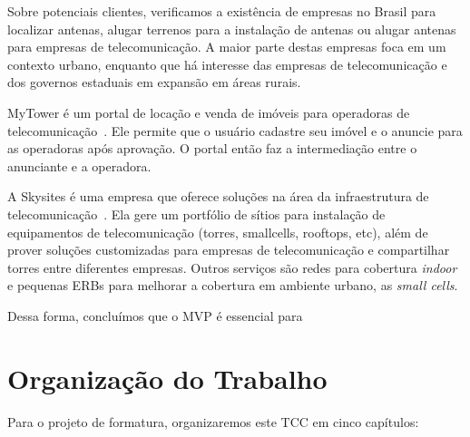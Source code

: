 \documentclass[]{politex}
\begin{document}
Sobre potenciais clientes, verificamos a existência de empresas no Brasil para
localizar antenas, alugar terrenos para a instalação de antenas ou alugar
antenas para empresas de telecomunicação. A maior parte destas empresas foca em
um contexto urbano, enquanto que há interesse das empresas de telecomunicação
e dos governos estaduais em expansão em áreas rurais.

MyTower é um portal de locação e venda de imóveis para operadoras de
telecomunicação~\cite{mytower}. Ele permite que o usuário cadastre seu imóvel
e o anuncie para as operadoras após aprovação.
O portal então faz a intermediação entre o anunciante e a operadora.

A Skysites é uma empresa que oferece soluções na área da infraestrutura de
telecomunicação~\cite{skysites}. Ela gere um portfólio de sítios para
instalação de equipamentos de telecomunicação (torres, smallcells, rooftops,
etc), além de prover soluções customizadas para empresas de telecomunicação e
compartilhar torres entre diferentes empresas. Outros serviços são redes para
cobertura \textit{indoor} e pequenas ERBs para melhorar a cobertura em ambiente
urbano, as \textit{small cells}.

Dessa forma, concluímos que o MVP é essencial para

\section{Organização do Trabalho}
Para o projeto de formatura, organizaremos este TCC em cinco capítulos:
\end{document}
